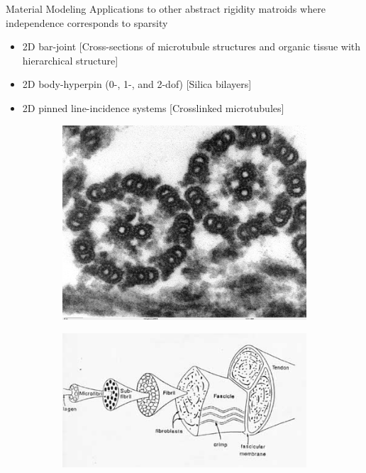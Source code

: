 \documentclass{beamer}
\begin{document}
\begin{frame}{Material Modeling}
    Applications to other abstract rigidity matroids where independence corresponds to sparsity
    \begin{itemize}
        \item 2D bar-joint [Cross-sections of microtubule structures and organic tissue with hierarchical structure]
        \item 2D body-hyperpin (0-, 1-, and 2-dof) [Silica bilayers]
        \item 2D pinned line-incidence systems [Crosslinked microtubules]
    \end{itemize}

    \begin{figure}\centering
        \begin{subfigure}{.24\linewidth}\centering
            \includegraphics[width=\linewidth]{../../img/Chlamydomonas_TEM_17}
        \end{subfigure}
        \hfill
        \begin{subfigure}{.24\linewidth}\centering
            \includegraphics[width=\linewidth]{../../img/ligten2.jpg}

\end{subfigure}
\end{figure}
\end{frame}
\end{document}
